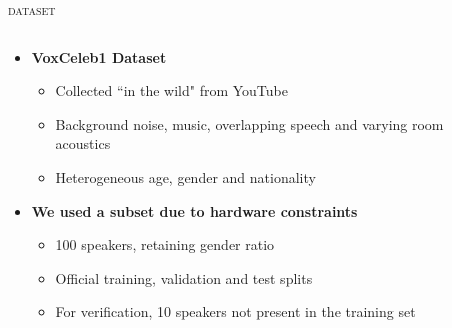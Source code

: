 \documentclass[10pt,aspectratio=1610,professionalfont]{beamer}
\begin{document}
\begin{frame}{\textsc{dataset}}
	 \begin{columns}
		\begin{column}{0.5\textwidth}
		 \begin{itemize}
	        \item \textbf{VoxCeleb1 Dataset}
	        \begin{itemize}
	            \item Collected “in the wild" from YouTube
	            \item Background noise, music, overlapping speech and varying room acoustics
	            \item Heterogeneous age, gender and nationality 
	        \end{itemize} 
	        \item \textbf{We used a subset due to hardware constraints}
	        \begin{itemize}
	            \item 100 speakers, retaining gender ratio
		      \item Official training, validation and test splits
		      \item For verification,	 10 speakers not present in the training set 
	        \end{itemize}
	    \end{itemize}
		\end{column}
		\begin{column}{0.5\textwidth} 
		\begin{center}
			     \begin{table}[htbp]
				    \begin{center}
\end{center}
\end{table}
\end{center}
\end{column}
\end{columns}
\end{frame}
\end{document}
